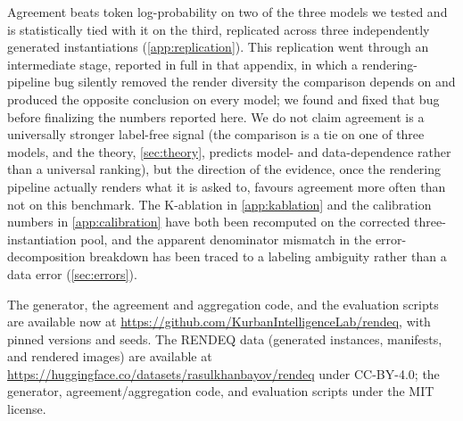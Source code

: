 \documentclass[11pt]{article}
\newcommand{\rea}{\mathrm{REA}}
\begin{document}
Agreement beats token log-probability on two of the three models we tested and is statistically tied with it on the third, replicated across three independently generated instantiations (\cref{app:replication}). This replication went through an intermediate stage, reported in full in that appendix, in which a rendering-pipeline bug silently removed the render diversity the comparison depends on and produced the opposite conclusion on every model; we found and fixed that bug before finalizing the numbers reported here. We do not claim agreement is a universally stronger label-free signal (the comparison is a tie on one of three models, and the theory, \cref{sec:theory}, predicts model- and data-dependence rather than a universal ranking), but the direction of the evidence, once the rendering pipeline actually renders what it is asked to, favours agreement more often than not on this benchmark. The K-ablation in \cref{app:kablation} and the calibration numbers in \cref{app:calibration} have both been recomputed on the corrected three-instantiation pool, and the apparent denominator mismatch in the error-decomposition breakdown has been traced to a labeling ambiguity rather than a data error (\cref{sec:errors}).

\begin{availability}
The generator, the agreement and aggregation code, and the evaluation scripts are available now at \url{https://github.com/KurbanIntelligenceLab/rendeq}, with pinned versions and seeds. The RENDEQ data (generated instances, manifests, and rendered images) are available at \url{https://huggingface.co/datasets/rasulkhanbayov/rendeq} under CC-BY-4.0; the generator, agreement/aggregation code, and evaluation scripts under the MIT license.
\end{availability}



\end{document}
